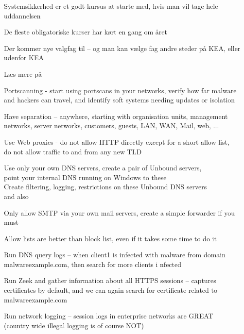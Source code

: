 \documentclass[Screen16to9,17pt]{foils}
\begin{document}


\begin{list2}
\item Systemsikkerhed er et godt kursus at starte med, hvis man vil tage hele uddannelsen
\item De fleste obligatoriske kurser har kørt en gang om året
\item Der kommer nye valgfag til -- og man kan vælge fag andre steder på KEA, eller udenfor KEA
\end{list2}

Læs mere på 

\myquestionspage




\begin{list2}
\item Portscanning - start using portscans in your networks, verify how far malware and hackers can travel, and identify soft systems needing updates or isolation
\item Have separation -- anywhere, starting with organisation units, management networks, server networks, customers, guests, LAN, WAN, Mail, web, ...
\item Use Web proxies - do not allow HTTP directly except for a short allow list, \\
do not allow traffic to and from any new TLD
\item Use only your own DNS servers, create a pair of Unbound servers, \\
point your internal DNS running on Windows to these\\
Create filtering, logging, restrictions on these Unbound DNS servers\\
 and also 
\item Only allow SMTP via your own mail servers, create a simple forwarder if you must
\end{list2}

Allow lists are better than block list, even if it takes some time to do it



\begin{list2}
\item Run DNS query logs -- when client1 is infected with malware from domain malwareexample.com, then search for more clients i
nfected
\item Run Zeek and gather information about all HTTPS sessions -- captures certificates by default, and we can again search for
certificate related to malwareexample.com
\item Run network logging -- session logs in enterprise networks are GREAT \\
(country wide illegal logging is of course NOT)
\end{list2}
\end{document}
